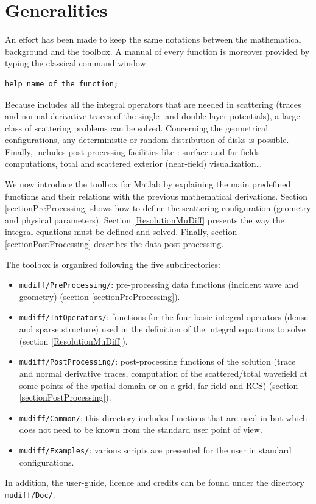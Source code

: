 \section{Generalities}
An effort has been made to keep the same notations between the mathematical background and the \mudiff toolbox. A manual of every function is moreover provided by typing the classical \matlab command window 
\begin{lstlisting}
help name_of_the_function;
\end{lstlisting}

Because \mudiff includes all the integral operators that are needed in scattering (traces and normal derivative
traces of the single- and double-layer potentials), a large class of scattering problems can be solved. 
Concerning the geometrical configurations, any deterministic or random distribution of disks is possible. Finally,
\mudiff includes post-processing facilities like \eg: surface and far-fields computations, total and scattered exterior (near-field)
visualization\ldots

We now introduce the \mudiff  toolbox for Matlab by explaining the main predefined functions and their relations
with the previous mathematical derivations.
Section \ref{sectionPreProcessing}  shows how to define the scattering configuration (geometry and physical parameters). Section
 \ref{ResolutionMuDiff}  presents the way the integral equations must be defined and solved.
  Finally, section \ref{sectionPostProcessing} describes the data post-processing. 

The \mudiff toolbox  is organized following the five subdirectories:
\begin{itemize}
\item \texttt{mudiff/PreProcessing/}: pre-processing data functions (incident wave and geometry) (section \ref{sectionPreProcessing}).
\item \texttt{mudiff/IntOperators/}: functions for the four basic integral operators (dense and sparse structure)
used in the definition of the integral equations to solve (section \ref{ResolutionMuDiff}). 
\item \texttt{mudiff/PostProcessing/}: post-processing functions of the solution (trace and normal derivative traces,
computation of the scattered/total wavefield 
at some points of the spatial domain or on a grid, far-field and RCS) 
(section \ref{sectionPostProcessing}).
\item \texttt{mudiff/Common/}: this directory includes functions that are used in \mudiff but which does not need to be known
from the standard user point of view.
\item \texttt{mudiff/Examples/}: various scripts are presented for the user in standard configurations.
\end{itemize}
In addition, the \mudiff user-guide, licence and credits can be found under the directory \texttt{mudiff/Doc/}.

